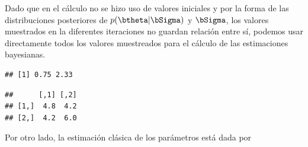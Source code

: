 \begin{Eje}
\begin{knitrout}
\begin{kframe}
\begin{alltt}
  \hlopt{:}
   \hlkwb{<-} \hlopt{-}
   \hlkwb{<-} \hlstd{(}\hlopt{/}
\hlstd{\}}
\end{alltt}
\end{kframe}
\end{knitrout}
Dado que en el cálculo no se hizo uso de valores iniciales y por la forma de las distribuciones posteriores de $p(\btheta|\bSigma)$ y $\bSigma$, los valores muestrados en la diferentes iteraciones no guardan relación entre sí, podemos usar directamente todos los valores muestreados para el cálculo de las estimaciones bayesianas.
\begin{knitrout}
\color{fgcolor}\begin{kframe}
\begin{alltt}
 \hlkwb{<-} 
 \hlkwb{<-} \hlstd{(}\hlstd{(}\hlstd{(Sigma.pos[,}\hlstd{,}\hlstd{]),}\hlstd{(Sigma.pos[,}\hlstd{,}\hlstd{]),}\hlstd{(Sigma.pos[,}\hlstd{,}\hlstd{]),}\hlstd{(Sigma.pos[,}\hlstd{,}\hlstd{])),}\hlstd{,}\hlstd{)}
\end{alltt}
\begin{verbatim}
## [1] 0.75 2.33
\end{verbatim}
\begin{alltt}
\end{alltt}
\begin{verbatim}
##      [,1] [,2]
## [1,]  4.8  4.2
## [2,]  4.2  6.0
\end{verbatim}
\end{kframe}
\end{knitrout}
Por otro lado, la estimación clásica de los parámetros está dada por
\begin{knitrout}
\color{fgcolor}\begin{kframe}
\begin{alltt}
\end{alltt}
\begin{verbatim}

\end{verbatim}
\end{kframe}
\end{knitrout}
\end{Eje}
